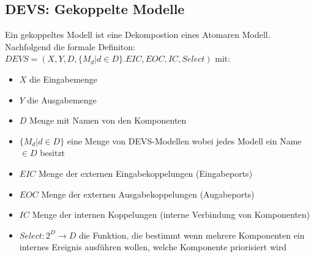 \documentclass[11pt, fleqn, a4paper, leqno]{scrartcl} %
\begin{document}
	\subsection{DEVS: Gekoppelte Modelle}
		Ein gekoppeltes Modell ist eine Dekompostion eines Atomaren Modell. Nachfolgend die formale Definiton: $DEVS = (X,Y,D,\{M_{d}|d \in D\}.EIC,EOC,IC,Select)$ mit:
		\begin{itemize}
			\item $X$ die Eingabemenge
			\item $Y$ die Ausgabemenge
			\item $D$ Menge mit Namen von den Komponenten
			\item $\{M_{d}|d \in D\}$ eine Menge von DEVS-Modellen wobei jedes Modell ein Name $\in D$ besitzt
			\item $EIC$ Menge der externen Eingabekoppelungen (Eingabeports)
			\item $EOC$ Menge der externen Ausgabekoppelungen (Augabeports)
			\item $IC$ Menge der internen Koppelungen (interne Verbindung von Komponenten)
			\item $Select: 2^{D} \rightarrow D$ die Funktion, die bestimmt wenn mehrere Komponenten ein internes Ereignis ausführen wollen, welche Komponente priorisiert wird
		\end{itemize}
\end{document}
